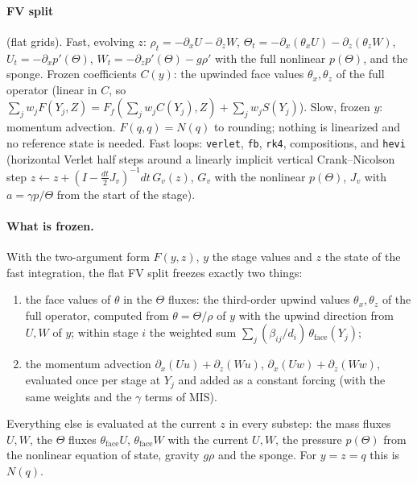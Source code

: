 \documentclass[11pt,a4paper]{article}
\newcommand{\code}[1]{\texttt{#1}}
\begin{document}
\paragraph{FV split} (flat grids). Fast, evolving $z$: $\rho_t=-\partial_xU-\partial_zW$,
$\Theta_t=-\partial_x(\theta_xU)-\partial_z(\theta_zW)$, $U_t=-\partial_xp'(\Theta)$,
$W_t=-\partial_zp'(\Theta)-g\rho'$ with the full nonlinear $p(\Theta)$, and the sponge. Frozen
coefficients $C(y)$: the upwinded face values $\theta_x,\theta_z$ of the full operator (linear in
$C$, so $\sum_jw_jF(Y_j,Z)=F_f(\sum_jw_jC(Y_j),Z)+\sum_jw_jS(Y_j)$). Slow, frozen $y$: momentum
advection. $F(q,q)=N(q)$ to rounding; nothing is linearized and no reference state is needed.
Fast loops: \code{verlet}, \code{fb}, \code{rk4}, compositions, and \code{hevi} (horizontal Verlet
half steps around a linearly implicit vertical Crank--Nicolson step
$z\leftarrow z+(I-\tfrac{dt}{2}J_v)^{-1}dt\,G_v(z)$, $G_v$ with the nonlinear $p(\Theta)$, $J_v$ with
$a=\gamma p/\Theta$ from the start of the stage).

\paragraph{What is frozen.} With the two-argument form $F(y,z)$, $y$ the stage values and $z$ the
state of the fast integration, the flat FV split freezes exactly two things:
\begin{enumerate}
\item the face values of $\theta$ in the $\Theta$ fluxes: the third-order upwind values
  $\theta_x,\theta_z$ of the full operator, computed from $\theta=\Theta/\rho$ of $y$ with the upwind
  direction from $U,W$ of $y$; within stage $i$ the weighted sum
  $\sum_j(\beta_{ij}/d_i)\,\theta_\mathrm{face}(Y_j)$;
\item the momentum advection $\partial_x(Uu)+\partial_z(Wu)$, $\partial_x(Uw)+\partial_z(Ww)$,
  evaluated once per stage at $Y_j$ and added as a constant forcing (with the same weights and the
  $\gamma$ terms of MIS).
\end{enumerate}
Everything else is evaluated at the current $z$ in every substep: the mass fluxes $U,W$, the
$\Theta$ fluxes $\theta_\mathrm{face}U$, $\theta_\mathrm{face}W$ with the current $U,W$, the pressure
$p(\Theta)$ from the nonlinear equation of state, gravity $g\rho$ and the sponge. For $y=z=q$ this
is $N(q)$.
\end{document}
